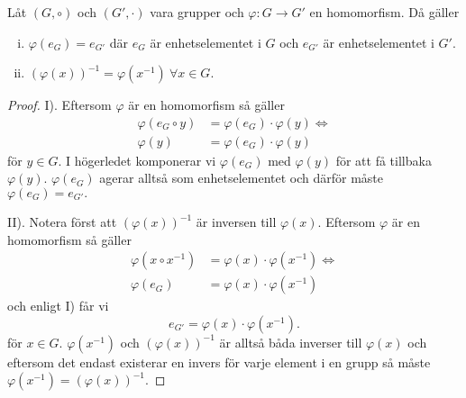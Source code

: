 \documentclass{article}
\theoremstyle{definition}
\begin{document}
\begin{mytheo}{}{}
  Låt $(G, \circ)$ och $(G', \cdot)$ vara grupper och 
  $\varphi: G \rightarrow G'$ en homomorfism. Då gäller 
  \begin{enumerate}[(i)]
    \item $\varphi(e_G) = e_{G'}$ där $e_G$ är enhetselementet i $G$ och $e_{G'}$ är
    enhetselementet i $G'$.
    \item $(\varphi(x))^{-1} = \varphi(x^{-1}) \ \forall x \in G.$
  \end{enumerate}
\end{mytheo}
\begin{proof}
  I). Eftersom $\varphi$ är en homomorfism så gäller 
  \begin{align*}
    \varphi (e_G \circ y) &= \varphi (e_G) \cdot \varphi (y) \iff \\
    \varphi (y) &= \varphi (e_G) \cdot \varphi (y)
  \end{align*}
  för $y \in G.$ I högerledet komponerar vi $\varphi (e_G)$ med $\varphi (y)$ för att få tillbaka 
  $\varphi (y)$. $\varphi (e_G)$ agerar alltså som enhetselementet och därför måste 
  $\varphi (e_G) = e_{G'}.$

  II). Notera först att $(\varphi(x))^{-1}$ är inversen till $\varphi(x)$. 
  Eftersom $\varphi$ är en homomorfism så gäller
  \begin{align*}
    \varphi (x \circ x^{-1}) &= \varphi (x) \cdot \varphi (x^{-1}) \iff \\
    \varphi (e_G) &= \varphi (x) \cdot \varphi (x^{-1})
  \end{align*}
  och enligt I) får vi
  \[e_{G'} =\varphi (x) \cdot \varphi (x^{-1}).\]
  för $x \in G.$
  $\varphi (x^{-1})$ och $(\varphi(x))^{-1}$ är alltså båda inverser till $\varphi (x)$
  och eftersom det endast existerar en invers för varje element i en grupp så måste 
  $\varphi (x^{-1}) = (\varphi(x))^{-1}.$
\end{proof}
\end{document}
